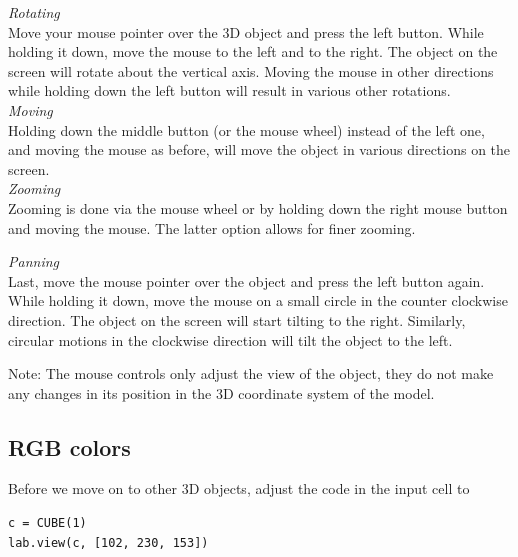 \noindent
{\em Rotating}\\

\noindent
Move your mouse pointer over the 3D object and press the left button. 
While holding it down, move the mouse to the left and to the right. 
The object on the screen will rotate about the vertical axis. Moving the 
mouse in other directions while holding down the left button will result 
in various other rotations.\\

\noindent
{\em Moving}\\

\noindent
Holding down the middle button (or the mouse wheel) instead of the 
left one, and moving the mouse as before, will move the object 
in various directions on the screen.\\

\noindent
{\em Zooming}\\

\noindent
Zooming is done via the mouse wheel or by holding down the right
mouse button and moving the mouse. The latter option allows for 
finer zooming.

\noindent
{\em Panning}\\

\noindent
Last, move the mouse pointer over the object and press the left 
button again. While holding it down, move the mouse on a small circle 
in the counter clockwise direction. The object on the screen will 
start tilting to the right. Similarly, circular motions 
in the clockwise direction will tilt the object to the left. \\

\begin{gbox}
\begin{center}
Note: The mouse controls only adjust the view of the object, they do not 
make any changes in its position in the 3D coordinate system of the model.
\end{center}
\end{gbox}


\subsection{RGB colors}

Before we move on to other 3D objects, adjust the code in the input cell to \\

\begin{bbox}
\begin{verbatim}
c = CUBE(1)
lab.view(c, [102, 230, 153])
\end{verbatim}
\end{bbox}
\vspace{6mm}

